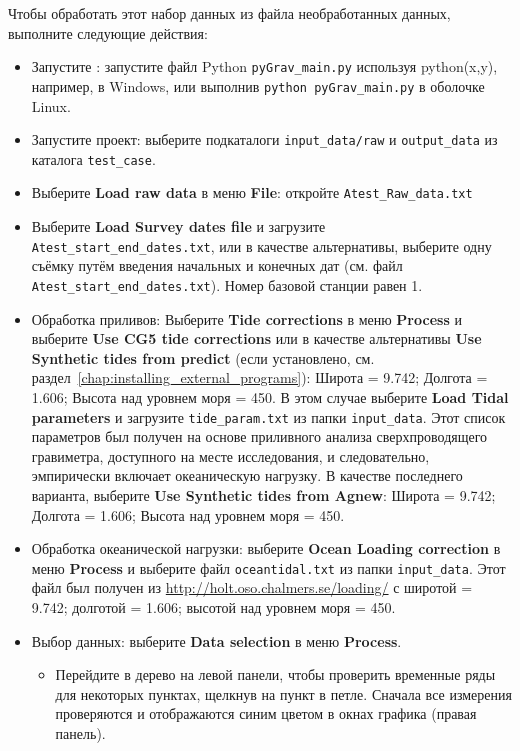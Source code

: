 Чтобы обработать этот набор данных из файла необработанных данных, выполните
следующие действия:
\begin{itemize}
    \item Запустите \pg{}: запустите файл Python \verb|pyGrav_main.py| используя
    python(x,y), например, в Windows, или выполнив \verb|python pyGrav_main.py| в
    оболочке Linux.

    \item Запустите проект: выберите подкаталоги \verb|input_data/raw| и \verb|output_data| из
    каталога \verb|test_case|.

    \item Выберите \textbf{Load raw data} в меню \textbf{File}: откройте \verb|Atest_Raw_data.txt|

    \item Выберите \textbf{Load Survey dates file} и загрузите
    \verb|Atest_start_end_dates.txt|, или в качестве альтернативы, выберите одну
    съёмку путём введения начальных и конечных дат (см. файл
    \verb|Atest_start_end_dates.txt|). Номер базовой станции равен 1.

    \item Обработка приливов: Выберите \textbf{Tide corrections} в меню
    \textbf{Process} и выберите \textbf{Use CG5 tide corrections} или в качестве
    альтернативы \textbf{Use Synthetic tides from predict} (если установлено,
    см. раздел~\ref{chap:installing_external_programs}): Широта = 9.742; Долгота
    = 1.606; Высота над уровнем моря = 450. В этом случае выберите \textbf{Load
    Tidal parameters} и загрузите \verb|tide_param.txt| из папки
    \verb|input_data|. Этот список параметров был получен на основе приливного
    анализа сверхпроводящего гравиметра, доступного на месте исследования, и
    следовательно, эмпирически включает океаническую нагрузку.  В качестве
    последнего варианта, выберите \textbf{Use Synthetic tides from Agnew}:
    Широта = 9.742; Долгота = 1.606; Высота над уровнем моря = 450.

    \item Обработка океанической нагрузки: выберите \textbf{Ocean Loading correction} в
    меню \textbf{Process} и выберите файл \verb|oceantidal.txt| из папки \verb|input_data|. Этот файл
    был получен из \url{http://holt.oso.chalmers.se/loading/} с широтой = 9.742;
    долготой = 1.606; высотой над уровнем моря = 450.

    \item Выбор данных: выберите \textbf{Data selection} в меню \textbf{Process}.
    \begin{itemize}
        \item Перейдите в дерево на левой панели, чтобы проверить временные ряды
        для некоторых пунктах, щелкнув на пункт в петле. Сначала все измерения
        проверяются и отображаются синим цветом в окнах графика (правая панель).
        

\end{itemize}
\end{itemize}
